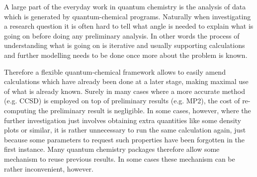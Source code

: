 

%
%
%
%

A large part of the everyday work in quantum chemistry
is the analysis of data which is generated by quantum-chemical programs.
Naturally when investigating a research question it is often
hard to tell what angle is needed to explain what is going on
before doing any preliminary analysis.
In other words the process of understanding what is going on is iterative
and usually supporting calculations and further modelling
needs to be done once more about the problem is known.

Therefore a flexible quantum-chemical framework allows to
easily amend calculations which have already been done
at a later stage, making maximal use of what is already known.
Surely in many cases where a more accurate method (e.g. CCSD) is employed
on top of preliminary results (e.g. MP2),
the cost of re-computing the preliminary result is negligible.
In some cases, however,
where the further investigation just involves obtaining
extra quantities like some density plots or similar,
it is rather unnecessary to run the same calculation again,
just because some parameters to request such properties
have been forgotten in the first instance.
Many quantum chemistry packages therefore allow
some mechanism to reuse previous results.
In some cases these mechanism can be rather inconvenient, however.


